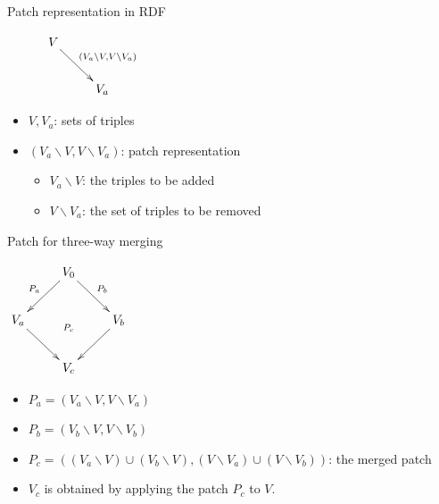 \documentclass[dvips,slidetop,mathserif,brown]{beamer}
\begin{document}
\begin{frame}{Patch representation in RDF}
\begin{block}{}
	\begin{center}
		$\xymatrix{
			& V \ar@{->}[dr]^-{(V_a\backslash V,V\backslash V_a)}   \\
			& & V_a
		}$
	\end{center}
\end{block}
\begin{itemize}
	\item $V, V_a$: sets of triples
	\item $(V_a\backslash V,V\backslash V_a)$: patch representation
	\begin{itemize}
		\item $V_a\backslash V$: the triples to be added
		\item $V\backslash V_a$: the set of triples to be removed
	\end{itemize}
\end{itemize}
\end{frame}

\begin{frame}{Patch for three-way merging}
\begin{block}{}
	  \begin{center}
		$\xymatrix{
			& V_0 \ar@{->}[dr]^-{P_b}  
				\ar[dl]_-{P_a} \\
			V_a \ar[dr] \ar@{}[rr]_-{P_c} & & V_b \ar@{->}[dl]^-{} \\
			& V_c
		}$
	\end{center}
\end{block}
\begin{itemize}
	\item $P_a=(V_a\backslash V,V\backslash V_a)$ 
	\item $P_b=(V_b\backslash V,V\backslash V_b)$
	\item $P_c=( (V_a\backslash V)\cup(V_b\backslash V),
	(V\backslash V_a)\cup(V\backslash V_b))$: the merged patch
	\item $V_c$ is obtained by applying the patch $P_c$ to $V$.
\end{itemize}
\end{frame}
\end{document}
